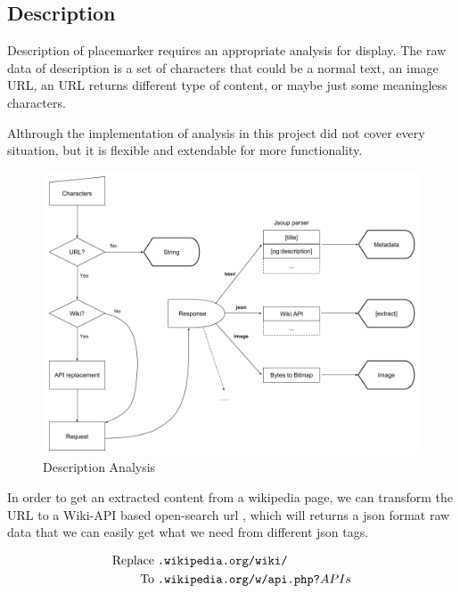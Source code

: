 \subsection{Description}

Description of placemarker requires an appropriate analysis for display. The raw data of description is a set of characters that could be a normal text, an image URL, an URL returns different type of content, or maybe just some meaningless characters.

Althrough the implementation of analysis in this project did not cover every situation, but it is flexible and extendable for more functionality.

\begin{figure}[H]
\caption[description-analysis]{Description Analysis}
\label{fig:description-analysis}
\centering
\includegraphics[width=\linewidth]{Figures/description-analysis.png}
\decoRule
\end{figure}

In order to get an extracted content from a wikipedia page, we can transform the URL to a Wiki-API based open-search url \parencite{wiki.api.2016}, which will returns a json format raw data that we can easily get what we need from different json tags.

\[
\begin{array}{lr}
\begin{aligned}
\text{Replace}\;&\texttt{.wikipedia.org/wiki/} \\
\text{To}\;&\texttt{.wikipedia.org/w/api.php?}APIs\\
\end{aligned}
\end{array}
\]

